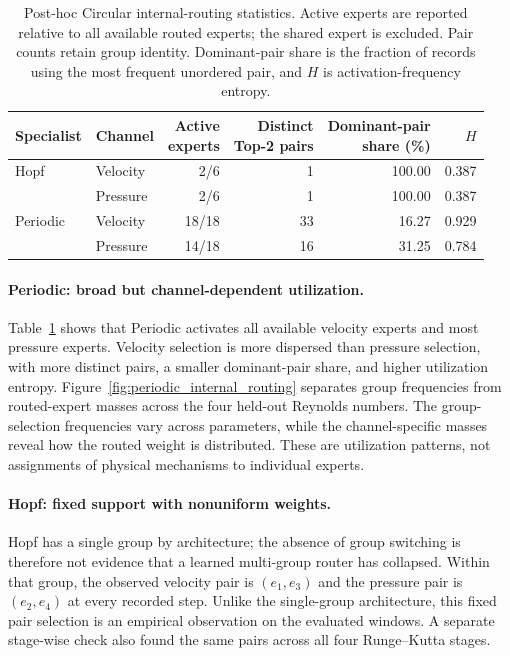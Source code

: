 \begin{table}[tbp]
\centering\small
\setlength{\tabcolsep}{5pt}
\caption{Post-hoc Circular internal-routing statistics. Active experts
are reported relative to all available routed experts; the shared
expert is excluded. Pair counts retain group identity. Dominant-pair
share is the fraction of records using the most frequent unordered
pair, and $H$ is activation-frequency entropy.}
\label{tab:internal_routing_summary}
\begin{tabular}{@{}llrrrr@{}}
\toprule
Specialist & Channel & \shortstack{Active\\experts}
& \shortstack{Distinct\\Top-2 pairs}
& \shortstack{Dominant-pair\\share (\%)} & $H$\\
\midrule
Hopf & Velocity & 2/6 & 1 & 100.00 & 0.387\\
& Pressure & 2/6 & 1 & 100.00 & 0.387\\
\addlinespace
Periodic & Velocity & 18/18 & 33 & 16.27 & 0.929\\
& Pressure & 14/18 & 16 & 31.25 & 0.784\\
\bottomrule
\end{tabular}
\end{table}

\paragraph{Periodic: broad but channel-dependent utilization.}
Table~\ref{tab:internal_routing_summary} shows that Periodic activates
all available velocity experts and most pressure experts. Velocity
selection is more dispersed than pressure selection, with more distinct
pairs, a smaller dominant-pair share, and higher utilization entropy.
Figure~\ref{fig:periodic_internal_routing} separates group frequencies
from routed-expert masses across the four held-out Reynolds numbers.
The group-selection frequencies vary across parameters, while the
channel-specific masses reveal how the routed weight is distributed.
These are utilization patterns, not assignments of physical mechanisms
to individual experts.

\paragraph{Hopf: fixed support with nonuniform weights.}
Hopf has a single group by architecture; the absence of group switching
is therefore not evidence that a learned multi-group router has collapsed.
Within that group, the observed velocity pair is $(e_1,e_3)$ and the
pressure pair is $(e_2,e_4)$ at every recorded step. Unlike the single-group
architecture, this fixed pair selection is an empirical observation on
the evaluated windows. A separate stage-wise check also found the same
pairs across all four Runge--Kutta stages.

